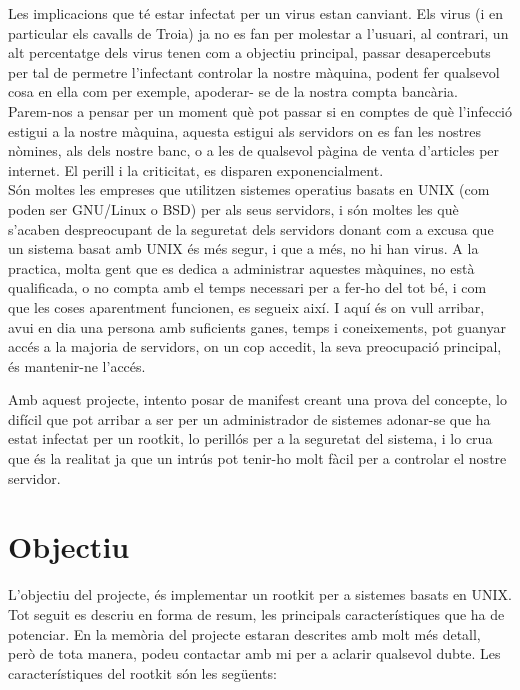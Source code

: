 \documentclass[a4paper]{article}
\begin{document}
Les implicacions que té estar infectat per un virus estan canviant. Els virus (i en particular
els cavalls de Troia) ja no es fan per molestar a l'usuari, al contrari, un alt percentatge dels
virus tenen com a objectiu principal, passar desapercebuts per tal de permetre l'infectant
controlar la nostre màquina, podent fer qualsevol cosa en ella com per exemple, apoderar-
se de la nostra compta bancària.\\
Parem-nos a pensar per un moment què pot passar si en comptes de què l'infecció estigui
a la nostre màquina, aquesta estigui als servidors on es fan les nostres nòmines, als dels
nostre banc, o a les de qualsevol pàgina de venta d'articles per internet. El perill i la
criticitat, es disparen exponencialment.\\
Són moltes les empreses que utilitzen sistemes operatius basats en UNIX (com poden ser
GNU/Linux o BSD) per als seus servidors, i són moltes les què s'acaben despreocupant
de la seguretat dels servidors donant com a excusa que un sistema basat amb UNIX és
més segur, i que a més, no hi han virus. A la practica, molta gent que es dedica a
administrar aquestes màquines, no està qualificada, o no compta amb el temps necessari
per a fer-ho del tot bé, i com que les coses aparentment funcionen, es segueix així.
I aquí és on vull arribar, avui en dia una persona amb suficients ganes, temps i
coneixements, pot guanyar accés a la majoria de servidors, on un cop accedit, la seva
preocupació principal, és mantenir-ne l'accés.


Amb aquest projecte, intento posar de manifest creant una prova del concepte, lo difícil
que pot arribar a ser per un administrador de sistemes adonar-se que ha estat infectat per
un rootkit, lo perillós per a la seguretat del sistema, i lo crua que és la realitat ja que un
intrús pot tenir-ho molt fàcil per a controlar el nostre servidor.

\section{Objectiu}

L'objectiu del projecte, és implementar un rootkit per a sistemes basats en UNIX. Tot seguit
es descriu en forma de resum, les principals característiques que ha de potenciar. En la
memòria del projecte estaran descrites amb molt més detall, però de tota manera, podeu contactar
amb mi per a aclarir qualsevol dubte. Les característiques del rootkit són les següents:
\end{document}
